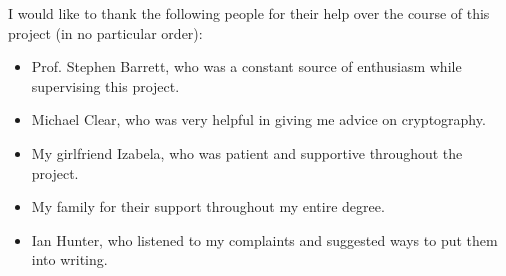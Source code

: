 \newpage
{}
\tableofcontents

\listoffigures


\begin{acknowledgments}

I would like to thank the following people for their help over the course of this project (in no particular order):
\begin{itemize}
	\item Prof. Stephen Barrett, who was a constant source of enthusiasm while supervising this project.
	\item Michael Clear, who was very helpful in giving me advice on cryptography.
	\item My girlfriend Izabela, who was patient and supportive throughout the project.
	\item My family for their support throughout my entire degree.
    \item Ian Hunter, who listened to my complaints and suggested ways to put them into writing.
\end{itemize}
\end{acknowledgments}


\newpage

\startarabicpagination


